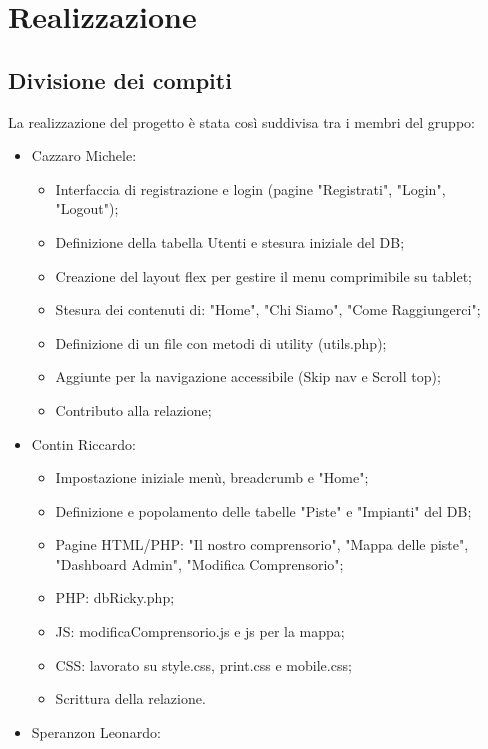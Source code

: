 \section{Realizzazione}

\subsection{Divisione dei compiti}

La realizzazione del progetto è stata così suddivisa tra i membri del gruppo:
\begin{itemize}
    \item Cazzaro Michele:
        \begin{itemize}
            \item Interfaccia di registrazione e login (pagine "Registrati", "Login", "Logout");
            \item Definizione della tabella Utenti e stesura iniziale del DB;
            \item Creazione del layout flex per gestire il menu comprimibile su tablet;
            \item Stesura dei contenuti di: "Home", "Chi Siamo", "Come Raggiungerci";
            \item Definizione di un file con metodi di utility (utils.php);
            \item Aggiunte per la navigazione accessibile (Skip nav e Scroll top);
            \item Contributo alla relazione;
        \end{itemize}
    \item Contin Riccardo:
        \begin{itemize}
            \item Impostazione iniziale menù, breadcrumb e "Home";
            \item Definizione e popolamento delle tabelle "Piste" e "Impianti" del DB;
            \item Pagine HTML/PHP: "Il nostro comprensorio", "Mappa delle piste", "Dashboard Admin", "Modifica Comprensorio";
            \item PHP: dbRicky.php;
            \item JS: modificaComprensorio.js e js per la mappa;
            \item CSS: lavorato su style.css, print.css e mobile.css;
            \item Scrittura della relazione.
        \end{itemize}
    \item Speranzon Leonardo:

\end{itemize}
